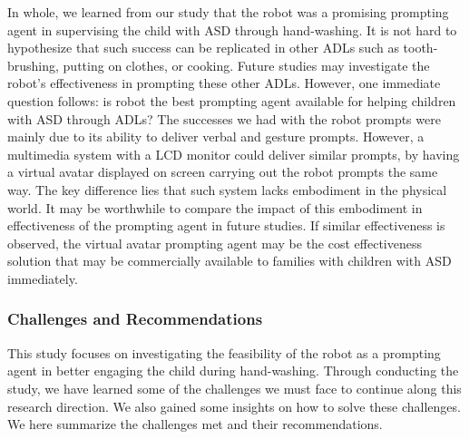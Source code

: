In whole, we learned from our study that the robot was a promising prompting agent in supervising the child with ASD through hand-washing.  It is not hard to hypothesize that such success can be replicated in other ADLs such as tooth-brushing, putting on clothes, or cooking.  Future studies may investigate the robot's effectiveness in prompting these other ADLs.  However, one immediate question follows: is robot the best prompting agent available for helping children with ASD through ADLs?  The successes we had with the robot prompts were mainly due to its ability to deliver verbal and gesture prompts.  However, a multimedia system with a LCD monitor could deliver similar prompts, by having a virtual avatar displayed on screen carrying out the robot prompts the same way.  The key difference lies that such system lacks embodiment in the physical world.  It may be worthwhile to compare the impact of this embodiment in effectiveness of the prompting agent in future studies.  If similar effectiveness is observed, the virtual avatar prompting agent may be the cost effectiveness solution that may be commercially available to families with children with ASD immediately.


\subsubsection{Challenges and Recommendations}
This study focuses on investigating the feasibility of the robot as a prompting agent in better engaging the child during hand-washing.  Through conducting the study, we have learned some of the challenges we must face to continue along this research direction.  We also gained some insights on how to solve these challenges.  We here summarize the challenges met and their recommendations.


